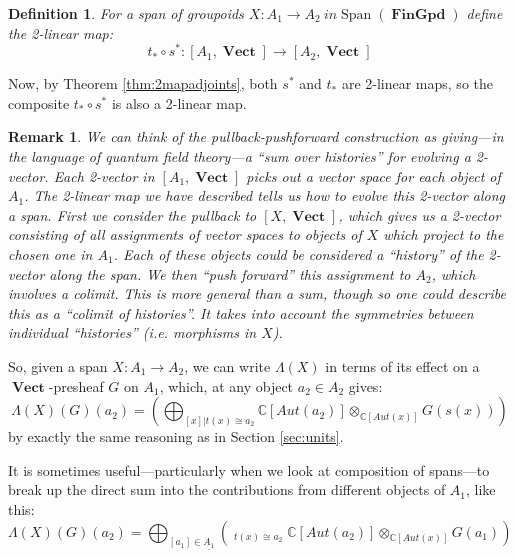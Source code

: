 \documentclass[10pt]{amsart}
\numberwithin{theorem}{subsection}
\newtheorem{definition}[theorem]{Definition}
\newtheorem{varremark}[theorem]{Remark}
\newenvironment{remark}{\begin{varremark}\em}{\em\end{varremark}}
\newcommand{\ra}{\mathop{\rightarrow}}
\newcommand{\opname}[1]{\operatorname{#1}}
\newcommand{\catname}[1]{\boldsymbol{\opname{{#1}}}}
\newcommand{\Span}{\opname{Span}}
\newcommand{\V}{\catname{Vect}}
\newcommand{\Gpd}{\catname{FinGpd}}
\newcommand{\HV}[1]{[#1,\V]}
\newcommand{\FV}{\Lambda}
\begin{document}
\begin{definition}\label{def:ZGonS} For a span of groupoids $X : A_1 \ra A_2 \ in \Span (\Gpd)$ define the 2-linear map:
\begin{equation}\label{eq:zstep4}
t_{\ast} \circ s^{\ast} : \HV{A_1} \longrightarrow \HV{A_2}
\end{equation}
\end{definition}

Now, by Theorem \ref{thm:2mapadjoints}, both $s^{\ast}$ and $t_{\ast}$
are 2-linear maps, so the composite $t_{\ast} \circ s^{\ast}$ is also
a 2-linear map.

\begin{remark} We can think of the pullback-pushforward construction
as giving---in the language of quantum field theory---a ``sum over
histories'' for evolving a 2-vector.  Each 2-vector in $\HV{A_1}$ picks
out a vector space for each object of $A_1$.  The 2-linear map we have
described tells us how to evolve this 2-vector along a span.  First we
consider the pullback to $\HV{X}$, which gives us a 2-vector
consisting of all assignments of vector spaces to objects of $X$ which
project to the chosen one in $A_1$.  Each of these objects could be
considered a ``history'' of the 2-vector along the span.  We then
``push forward'' this assignment to $A_2$, which involves a colimit.
This is more general than a sum, though so one could describe this as
a ``colimit of histories''.  It takes into account the symmetries
between individual ``histories'' (i.e. morphisms in $X$).
\end{remark}

So, given a span $X : A_1 \ra A_2$, we can write $\FV(X)$ in terms of its effect on a $\V$-presheaf $G$ on $A_1$, which, at any object $a_2 \in A_2$ gives:
\begin{equation}\label{eq:FVX}
\FV(X)(G)(a_2) = ( \bigoplus_{[x] | t(x) \cong a_2} \mathbb{C}[Aut(a_2)] \otimes_{\mathbb{C}[Aut(x)]} G(s(x)) )
\end{equation}
by exactly the same reasoning as in Section \ref{sec:units}.

It is sometimes useful---particularly when we look at composition of
spans---to break up the direct sum into the contributions from
different objects of $A_1$, like this:
\begin{equation}\label{eq:decomposedFVX}
\FV(X)(G)(a_2) = \bigoplus_{[a_1] \in \underline{A_1}} ( \mathop{\bigoplus_{\stackrel{[x]}{s(x) \cong a_1}}}_{{t(x) \cong a_2}} \mathbb{C}[Aut(a_2)] \otimes_{\mathbb{C}[Aut(x)]} G(a_1) )
\end{equation}
\end{document}
